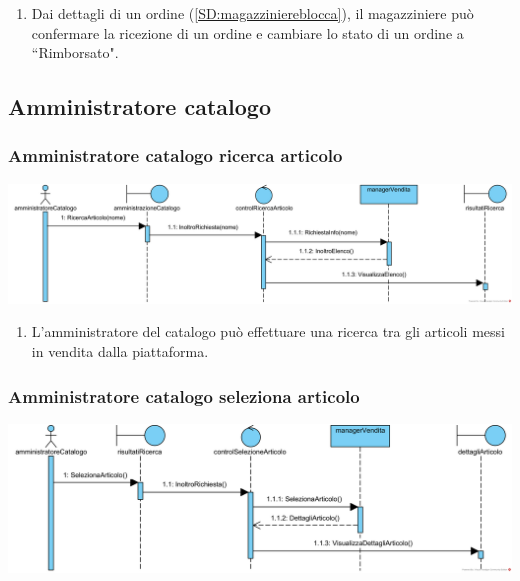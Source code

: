 \documentclass[12pt]{article}
\begin{document}
\begin{enumerate}
\item Dai dettagli di un ordine (\ref{SD:magazziniereblocca}), il magazziniere può confermare la ricezione di un ordine e cambiare lo stato di un ordine a ``Rimborsato".
\end{enumerate}

\newpage

\subsection{Amministratore catalogo}
\subsubsection{Amministratore catalogo ricerca articolo}
\label{SD:amcatvisualizzaelenco}
\begin{center}
\includegraphics[width=\textwidth]{SequenceDiagram/AmministratoreCatalogoVenditaRicerca}
\end{center}

\begin{enumerate}
\item L'amministratore del catalogo può effettuare una ricerca tra gli articoli messi in vendita dalla piattaforma.
\end{enumerate}

\subsubsection{Amministratore catalogo seleziona articolo}
\label{SD:amcatselezionaarticolo}
\begin{center}
\includegraphics[width=\textwidth]{SequenceDiagram/AmministratoreCatalogoVenditaSeleziona}
\end{center}
\end{document}
